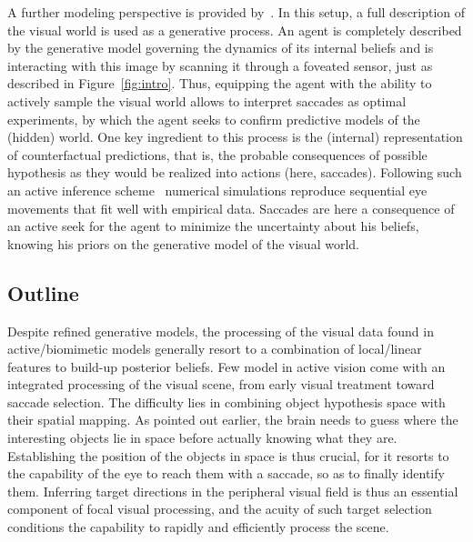 A further modeling perspective is provided by~\cite{Friston12}. In this setup, a full description of the visual world is used as a generative process. An agent is completely described by the generative model governing the dynamics of its internal beliefs and is interacting with this image by scanning it through a foveated sensor, just as described in Figure~\ref{fig:intro}. Thus, equipping the agent with the ability to actively sample the visual world %
allows to interpret saccades as optimal experiments, by which the agent seeks to confirm predictive models of the (hidden) world. One key ingredient to this process is the (internal) representation of counterfactual predictions, that is, the probable consequences of possible hypothesis as they would be realized into actions (here, saccades). Following such an active inference scheme~\cite{Mirza18} numerical simulations reproduce sequential eye movements that fit well with empirical data. %
Saccades %
are here a consequence of an active seek for the agent to minimize the uncertainty about his beliefs, knowing his priors on the generative model of the visual world.

\subsection{Outline}

Despite refined generative models, the processing of the visual data found in active/biomimetic models generally resort to a combination of local/linear features to build-up posterior beliefs. Few model in active vision come with an integrated processing of the visual scene, from early visual treatment toward saccade selection. The difficulty lies in combining object hypothesis space with their spatial mapping. As pointed out earlier, the brain needs to guess where the interesting objects lie in space before actually knowing what they are. Establishing the position of the objects in space is thus crucial, for it resorts to the capability of the eye to reach them with a saccade, so as to finally identify them. Inferring target directions in the peripheral visual field is thus an essential component of focal visual processing, and the acuity of such target selection conditions the capability to rapidly and efficiently process the scene.

